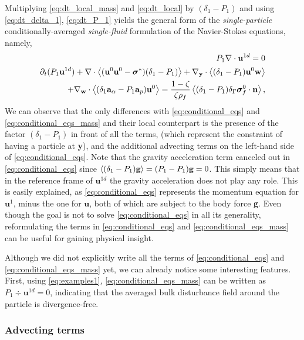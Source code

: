 Multiplying \ref{eq:dt_local_mass} and \ref{eq:dt_local} by $(\delta_1 - P_1)$ and using \ref{eq:dt_delta_1},  \ref{eq:dt_P_1} yields the general form of the \textit{single-particle} conditionally-averaged \textit{single-fluid} formulation of the Navier-Stokes equations, namely,  
\begin{align}
    P_1 \div \textbf{u}^{1d}
    = 0 
    \label{eq:conditional_eqs_mass}
    \\
    \pddt (P_1 \textbf{u}^{1d})
    + \div \avg{(\textbf{u}^0 \textbf{u}^0 - \bm\sigma^*)(\delta_1 - P_1)} 
    + \pddy\cdot\avg{(\delta_1 - P_1)\textbf{u}^0 \textbf{w}}\nonumber \\ 
    + \pddw\cdot \avg{(\delta_1\textbf{a}_\alpha - P_1\textbf{a}_p) \textbf{u}^0}
    =  \frac{1 - \zeta}{\zeta\rho_f}\avg{ (\delta_1 - P_1) \delta_\Gamma \bm\sigma_f^0\cdot \textbf{n}},
    \label{eq:conditional_eqs}
\end{align}
We can observe that the only differences with \ref{eq:conditional_eqs} and \ref{eq:conditional_eqs_mass} and their local counterpart is the presence of the factor $(\delta_1 - P_1)$ in front of all the terms, (which represent the constraint of having a particle at \textbf{y}), and the additional advecting terms on the left-hand side of \ref{eq:conditional_eqs}. 
Note that the gravity acceleration term canceled out in \ref{eq:conditional_eqs} since $\left<(\delta_1 - P_1)\textbf{g}\right> = (P_1 -P_1 )\textbf{g} =0$. 
This simply means that in the reference frame of $\textbf{u}^{1d}$ the gravity acceleration does not play any role.
This is easily explained, as \ref{eq:conditional_eqs} represents the momentum equation for $\textbf{u}^{1}$, minus the one for $\textbf{u}$, both of which are subject to the body force \textbf{g}.
Even though the goal is not to solve \ref{eq:conditional_eqs} in all its generality, reformulating the terms in \ref{eq:conditional_eqs} and \ref{eq:conditional_eqs_mass} can be useful for gaining physical insight. 


Although we did not explicitly write all the terms of \ref{eq:conditional_eqs} and \ref{eq:conditional_eqs_mass} yet, we can already notice some interesting features. 
First, using \ref{eq:examples1},  \ref{eq:conditional_eqs_mass} can be written as $P_1 \div \textbf{u}^{1d} =0$, indicating that the averaged bulk disturbance field around the particle is divergence-free.  

\subsubsection{Advecting terms}

